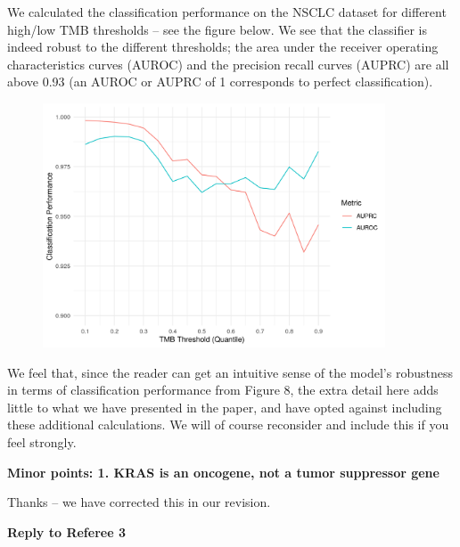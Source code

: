 \documentclass[12pt]{article}
\begin{document}
We calculated the classification performance on the NSCLC dataset for different high/low TMB thresholds -- see the figure below.   We see that the classifier is indeed robust to the different thresholds; the area under the receiver operating characteristics curves (AUROC) and the precision recall curves (AUPRC) are all above 0.93 (an AUROC or AUPRC of 1 corresponds to perfect classification).  %

\begin{figure}[htbp]
\centering
\includegraphics[width=4in]{../../results/figures/quantile_thresholds_fig.png}
\end{figure} 

We feel that, since the reader can get an intuitive sense of the model's robustness in terms of classification performance from Figure 8, the extra detail here adds little to what we have presented in the paper, and have opted against including these additional calculations.  We will of course reconsider and include this if you feel strongly.  

\textbf{Minor points: 1. KRAS is an oncogene, not a tumor suppressor gene}

Thanks -- we have corrected this in our revision. 

\begin{thebibliography}{75}

\end{thebibliography}

\clearpage

{\large \textbf{Reply to Referee 3}}
\end{document}

